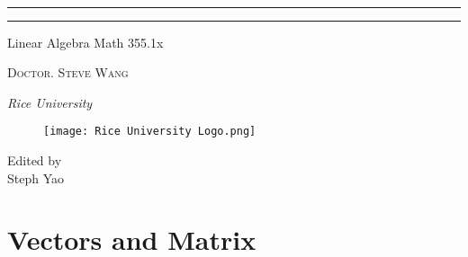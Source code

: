 \documentclass{package/notes}
\begin{document}
\begin{titlepage}
\vspace{0.75\baselineskip} %
{\huge {}\\} %

\vspace{0.75\baselineskip} %

\rule{\textwidth}{0.4pt}\vspace*{-\baselineskip}\vspace{3.2pt} %
\rule{\textwidth}{1.6pt} %

\vspace{2\baselineskip} %


\LARGE{ Linear Algebra Math 355.1x} 

\vspace*{3\baselineskip} %



\vspace{0.5\baselineskip} 

{\scshape   \LARGE Doctor. Steve Wang\\ } %

\vspace{0.2\baselineskip} 

\textit{\Large Rice University} 

\vfill 


\begin{figure}[!h]
    \centering
    \texttt{[image: Rice University Logo.png]}%
\end{figure}
\vspace{0.3\baselineskip} 


{\large Edited by\\  Steph Yao}
\end{titlepage}

\newpage

\tableofcontents


\chapter{Vectors and Matrix}
\end{document}
